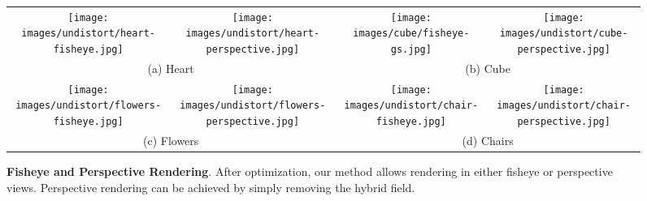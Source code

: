 {
\begin{figure*}[t]
    \centering
    \setlength{\tabcolsep}{1pt} %
    \begin{tabular}{cccc} %
        
        \texttt{[image: images/undistort/heart-fisheye.jpg]} &
        \texttt{[image: images/undistort/heart-perspective.jpg]} & 
        \texttt{[image: images/cube/fisheye-gs.jpg]} &
        \texttt{[image: images/undistort/cube-perspective.jpg]} \\
        \multicolumn{2}{c}{(a) Heart} & \multicolumn{2}{c}{(b) Cube}
        \\
        \texttt{[image: images/undistort/flowers-fisheye.jpg]} &
        \texttt{[image: images/undistort/flowers-perspective.jpg]} &
        \texttt{[image: images/undistort/chair-fisheye.jpg]} &
        \texttt{[image: images/undistort/chair-perspective.jpg]}\\
        \multicolumn{2}{c}{(c) Flowers} & \multicolumn{2}{c}{(d) Chairs}
    \end{tabular}

    \caption{\textbf{Fisheye and Perspective Rendering}. After optimization, our method allows rendering in either fisheye or perspective views. Perspective rendering can be achieved by simply removing the hybrid field.}

    \label{fig:ours_undistort}

\end{figure*}
}